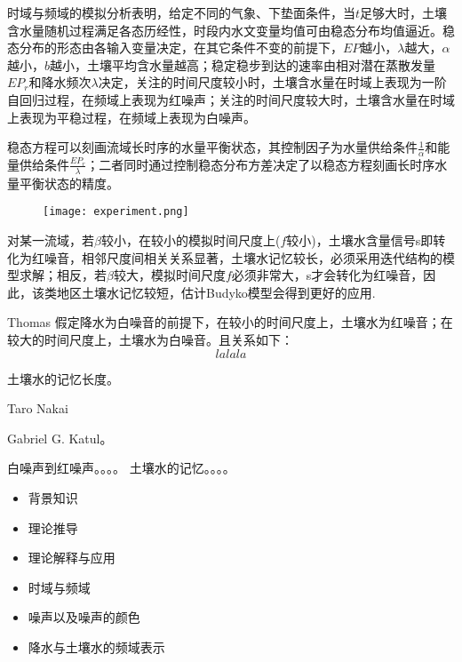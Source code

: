 时域与频域的模拟分析表明，给定不同的气象、下垫面条件，当$t$足够大时，土壤含水量随机过程满足各态历经性，时段内水文变量均值可由稳态分布均值逼近。稳态分布的形态由各输入变量决定，在其它条件不变的前提下，$EP$越小，$\lambda$越大，$\alpha$越小，$b$越小，土壤平均含水量越高；稳定稳步到达的速率由相对潜在蒸散发量$EP_r$和降水频次$\lambda$决定，关注的时间尺度较小时，土壤含水量在时域上表现为一阶自回归过程，在频域上表现为红噪声；关注的时间尺度较大时，土壤含水量在时域上表现为平稳过程，在频域上表现为白噪声。

稳态方程可以刻画流域长时序的水量平衡状态，其控制因子为水量供给条件$\frac{1}{\alpha}$和能量供给条件$\frac{EP_r}{\lambda}$；二者同时通过控制稳态分布方差决定了以稳态方程刻画长时序水量平衡状态的精度。














\iffalse
\begin{figure}[H]
\centering
\texttt{[image: experiment.png]}
\end{figure}
对某一流域，若$\beta$较小，在较小的模拟时间尺度上($f$较小)，土壤水含量信号s即转化为红噪音，相邻尺度间相关关系显著，土壤水记忆较长，必须采用迭代结构的模型求解；相反，若$\beta$较大，模拟时间尺度$f$必须非常大，s才会转化为红噪音，因此，该类地区土壤水记忆较短，估计Budyko模型会得到更好的应用.
 
Thomas\cite{delworth1988influence}
假定降水为白噪音的前提下，在较小的时间尺度上，土壤水为红噪音；在较大的时间尺度上，土壤水为白噪音。且关系如下：
\begin{equation}
lalala
\end{equation}

土壤水的记忆长度。

Taro Nakai\cite{nakai2014radiative}

Gabriel G. Katul\cite{katul2007spectrum}。


白噪声到红噪声。。。。
土壤水的记忆。。。。
\begin{itemize}
\item 背景知识
\item 理论推导
\item 理论解释与应用
\end{itemize}
 



 
\begin{itemize}
\item 时域与频域
\item 噪声以及噪声的颜色
\item 降水与土壤水的频域表示
\end{itemize}
 

